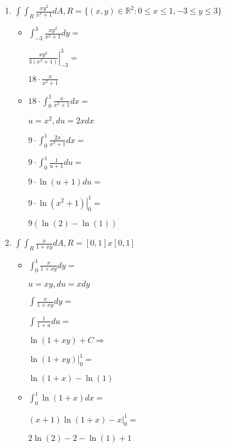 \documentclass[../practica_08.tex]{subfiles}
\begin{document}
    \begin{enumerate}
        \item $ \int\int_R \frac{xy^2}{x^2+1} dA, R=\{(x,y) \in \mathbb{R}^2: 0\leq x\leq 1, -3 \leq y \leq 3\} $

            \begin{itemize}
                \item $ \int_{-3}^3 \frac{xy^2}{x^2+1} dy =  $
                
                    $ \left. \frac{xy^3}{3(x^2+1)} \right |_{-3}^3 = $

                    $ 18 \cdot \frac{x}{x^2+1} $

                \item $ 18 \cdot \int_{0}^1 \frac{x}{x^2+1} dx = $

                    $ u = x^2, du = 2x dx$

                    $ 9 \cdot \int_{0}^1 \frac{2x}{x^2+1} dx = $

                    $ 9 \cdot \int_{0}^1 \frac{1}{u+1} du = $

                    $ 9 \cdot \ln(u+1) du = $

                    $ 9 \cdot \left. \ln(x^2+1) \right |_0^1 = $

                    $ 9(\ln(2) - \ln(1))  $

            \end{itemize}

        \item $ \int\int_R \frac{x}{1+xy} dA, R=[0,1]x[0,1] $
        
            \begin{itemize}
                \item $ \int_0^1 \frac{x}{1+xy} dy = $
                
                    $ u = xy, du = x dy $

                    $\int \frac{x}{1+xy} dy = $

                    $\int \frac{1}{1+u} du = $

                    $ \ln(1+xy) + C \Rightarrow$
                    
                    $ \left. \ln(1+xy) \right |_0^1 = $

                    $ \ln(1+x) - \ln(1) $

                \item $ \int_0^1 \ln(1+x) dx = $

                    $ \left. (x+1)\ln(1+x)-x \right |_0^1 = $

                    $ 2\ln(2) - 2 - \ln(1) + 1 $

            \end{itemize}

    \end{enumerate} 
\end{document}
